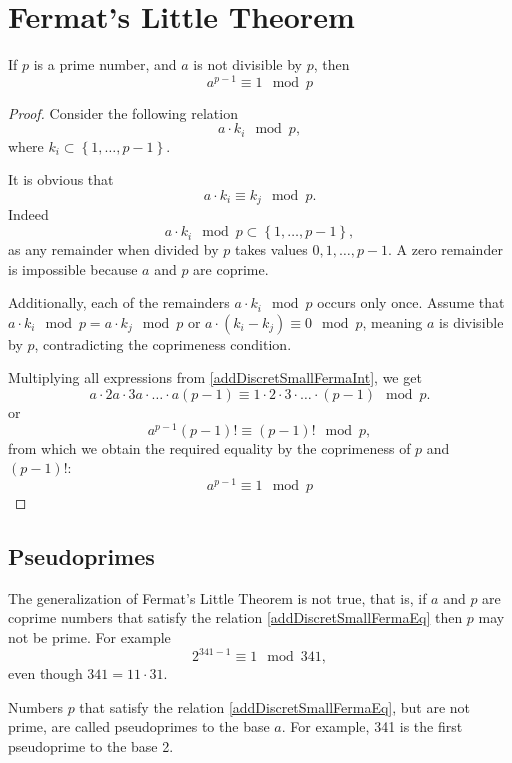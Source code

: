 \section{Fermat's Little Theorem}

\begin{theorem}
\label{addDiscretSmallFerma}
If $p$ is a prime number, and $a$ is not divisible by $p$, then 
\begin{equation}
a^{p-1} \equiv 1 \mod{p}
\label{addDiscretSmallFermaEq}
\end{equation}
\end{theorem}

\begin{proof}
Consider the following relation
\[
a \cdot k_i \mod{p},
\]
where $k_i \subset \left\{1, \dots, p - 1\right\}$.

It is obvious that 
\begin{equation}
a \cdot k_i \equiv k_j \mod{p}.
\label{addDiscretSmallFermaInt}
\end{equation}
Indeed
\[
a \cdot k_i \mod{p} \subset \left\{1, \dots, p - 1\right\},
\]
as any remainder when divided by $p$ takes values $0, 1, \dots, p-1$. A zero remainder is impossible because $a$ and $p$ are coprime.

Additionally, each of the remainders $a \cdot k_i \mod{p}$ occurs only once. Assume that $a \cdot k_i \mod{p} = a \cdot k_j \mod{p}$ or $a \cdot \left( k_i - k_j \right ) \equiv 0 \mod{p}$, meaning $a$ is divisible by $p$, contradicting the coprimeness condition.

Multiplying all expressions from \autoref{addDiscretSmallFermaInt}, we get
\[
a \cdot 2a \cdot 3a \cdot \dots \cdot a\left(p - 1\right) 
\equiv 1 \cdot 2 \cdot 3 \cdot \dots \cdot \left(p - 1\right) \mod{p}.
\]
or
\[
a^{p-1} \left(p - 1\right)! \equiv \left(p - 1\right)! \mod{p},
\]
from which we obtain the required equality by the coprimeness of $p$ and $\left(p-1\right)!$:
\[
a^{p-1} \equiv 1 \mod{p}
\]
\end{proof}

\subsection{Pseudoprimes}
The generalization of Fermat's Little Theorem is not true, that is, if $a$ and $p$ are coprime numbers that satisfy the relation \autoref{addDiscretSmallFermaEq} then $p$ may not be prime. For example
\[
2 ^ {341 - 1} \equiv 1 \mod{ 341 },
\] 
even though $341 = 11 \cdot 31$.

Numbers $p$ that satisfy the relation \autoref{addDiscretSmallFermaEq}, but are not prime, are called pseudoprimes to the base $a$. For example, 341 is the first pseudoprime to the base 2.